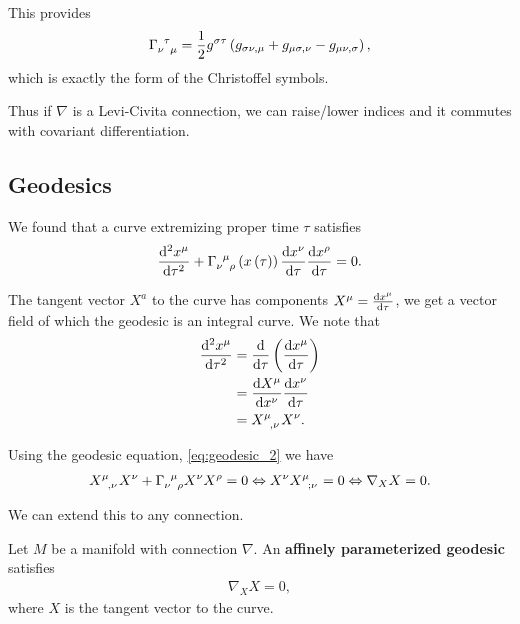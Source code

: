This provides
\begin{align}
    \tensor{\Gamma}{_{\nu}^{\tau}_{\mu}} = \frac{1}{2} g^{\sigma \tau} \left( g_{\sigma \nu , \mu} + g_{\mu \sigma , \nu} - g_{\mu \nu , \sigma} \right) 
,\end{align}
which is exactly the form of the Christoffel symbols.

Thus if $\nabla$ is a Levi-Civita connection, we can raise/lower indices and it commutes with covariant differentiation.

\subsection{Geodesics}

We found that a curve extremizing proper time $\tau$ satisfies
\begin{align}\label{eq:geodesic_2}
    \dv[2]{x^{\mu}}{\tau} + \tensor{\Gamma}{_{\nu}^{\mu}_{\rho}}\left( x \left( \tau \right)  \right) \dv{x^{\nu}}{\tau} \dv{x^{\rho}}{\tau} = 0
.\end{align}

The tangent vector $X^{a}$ to the curve has components $X^{\mu} = \dv{x^{\mu}}{\tau}$, we get a vector field of which the geodesic is an integral curve. We note that
\begin{align}
    \dv[2]{x^{\mu}}{\tau} &= \dv{\tau} \left( \dv{x^{\mu}}{\tau} \right)   \\
    &= \dv{X^{\mu}}{x^{\nu}} \dv{x^{\nu}}{\tau} \\
    &= \tensor{X}{^{\mu}_{,\nu}} X^{\nu}
.\end{align}

Using the geodesic equation, \cref{eq:geodesic_2} we have
\begin{align}
    \tensor{X}{^{\mu}_{,\nu}} X^{\nu} + \tensor{\Gamma}{_{\nu}^{\mu}_{\rho}} X^{\nu} X^{\rho} = 0 \iff X^{\nu} \tensor{X}{^{\mu}_{;\nu}} = 0 \iff \nabla_X X = 0
.\end{align}

We can extend this to any connection.

\begin{definition}
    Let $M$ be a manifold with connection $\nabla$. An \textbf{affinely parameterized geodesic} satisfies
    \begin{align}
        \nabla_X X = 0
    ,\end{align}
    where $X$ is the tangent vector to the curve.
\end{definition}





